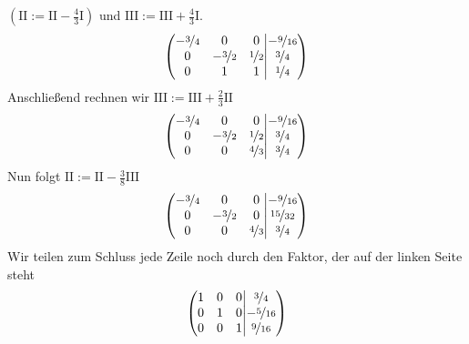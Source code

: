 \documentclass[11pt,a4paper,DIV=12]{scrartcl}
\begin{document}
$\left(\mathrm{II}:=\mathrm{II}-\frac{4}{3}\mathrm{I}\right)$ und $\mathrm{III}:=\mathrm{III}+\frac{4}{3}\mathrm{I}$.
%
%
%
\begin{gather}
	\left\lparen
	\begin{matrix}
		-\nicefrac{3}{4} & 0 & 0 \\
		0 & -\nicefrac{3}{2} & \nicefrac{1}{2} \\
		0 & 1 & 1
	\end{matrix}
	\middle\vert
	\begin{matrix}
		-\nicefrac{9}{16} \\
		\nicefrac{3}{4} \\
		\nicefrac{1}{4}
	\end{matrix}
	\right\rparen
\end{gather}
%
%
%
Anschließend rechnen wir $\mathrm{III}:=\mathrm{III}+\frac{2}{3}\mathrm{II}$
%
%
%
\begin{gather}
	\left\lparen
	\begin{matrix}
		-\nicefrac{3}{4} & 0 & 0 \\
		0 & -\nicefrac{3}{2} & \nicefrac{1}{2} \\
		0 & 0 & \nicefrac{4}{3}
	\end{matrix}
	\middle\vert
	\begin{matrix}
		-\nicefrac{9}{16} \\
		\nicefrac{3}{4} \\
		\nicefrac{3}{4}
	\end{matrix}
	\right\rparen
\end{gather}
%
%
%
Nun folgt $\mathrm{II}:=\mathrm{II}-\frac{3}{8}\mathrm{III}$
%
%
%
\begin{gather}
	\left\lparen
	\begin{matrix}
		-\nicefrac{3}{4} & 0 & 0 \\
		0 & -\nicefrac{3}{2} & 0 \\
		0 & 0 & \nicefrac{4}{3}
	\end{matrix}
	\middle\vert
	\begin{matrix}
		-\nicefrac{9}{16} \\
		\nicefrac{15}{32} \\
		\nicefrac{3}{4}
	\end{matrix}
	\right\rparen
\end{gather}
%
%
%
Wir teilen zum Schluss jede Zeile noch durch den Faktor, der auf
der linken Seite steht
%
%
%
\begin{gather}
	\left\lparen
	\begin{matrix}
		1 & 0 & 0 \\
		0 & 1 & 0 \\
		0 & 0 & 1
	\end{matrix}
	\middle\vert
	\begin{matrix}
		\nicefrac{3}{4} \\
		-\nicefrac{5}{16} \\
		\nicefrac{9}{16}
	\end{matrix}
	\right\rparen
\end{gather}
\end{document}
